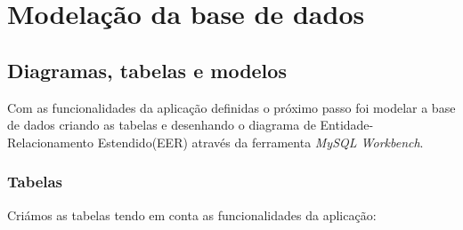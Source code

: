 \section{Modelação da base de dados} \label{section: Modelacao}

\subsection{Diagramas, tabelas e modelos}
Com as funcionalidades da aplicação definidas o próximo passo foi modelar a base de dados criando as tabelas e desenhando o diagrama de Entidade-Relacionamento Estendido(EER) através da ferramenta \textit{MySQL Workbench}.

\subsubsection{Tabelas}

Criámos as tabelas tendo em conta as funcionalidades da aplicação:

